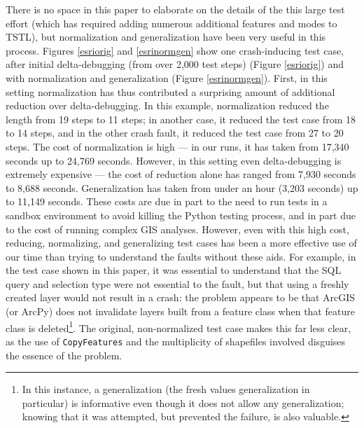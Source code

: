 There is no space in this paper to elaborate on the details of the
this large test effort (which has required adding numerous additional
features and modes to TSTL), but normalization and generalization have been very useful in
this process.  Figures \ref{esriorig} and \ref{esrinormgen} show one
crash-inducing test case, after initial delta-debugging (from over
2,000 test steps) (Figure \ref{esriorig}) and with normalization and
generalization (Figure \ref{esrinormgen}).  First, in this setting
normalization has thus contributed a surprising amount of additional
reduction over delta-debugging.  In this example, normalization
reduced the length from 19 steps to 11 steps; in another case, it
reduced the test case from 18 to 14 steps, and in the other crash
fault, it reduced the test case from 27 to 20 steps.  The cost of
normalization is high --- in our runs, it has taken from 17,340
seconds up to 24,769 seconds.  However, in this setting even
delta-debugging is extremely expensive --- the cost of reduction alone
has ranged from 7,930 seconds to 8,688 seconds.  Generalization has
taken from under an hour (3,203 seconds) up to 11,149 seconds.  These
costs are due in part to the need to run tests in a sandbox
environment to avoid killing the Python testing process, and in part
due to the cost of running complex GIS analyses.  However, even with
this high cost, reducing, normalizing, and generalizing test cases has
been a more effective use of our time than trying to understand the
faults without these aids.  For example, in the test case shown in
this paper, it was essential to understand that the SQL query and
selection type were not essential to the fault, but that using a
freshly created layer would not result in a crash:  the problem
appears to be that ArcGIS (or ArcPy) does not invalidate layers built
from a feature class when that feature class is deleted\footnote{In
  this instance, a generalization (the fresh values generalization in
  particular) is informative even though it does not allow any
  generalization; knowing that it was attempted, but prevented the
  failure, is also valuable.}.  The
original, non-normalized test case makes this far less clear, as the
use of {\tt CopyFeatures} and the multiplicity of shapefiles involved
disguises the essence of the problem.

